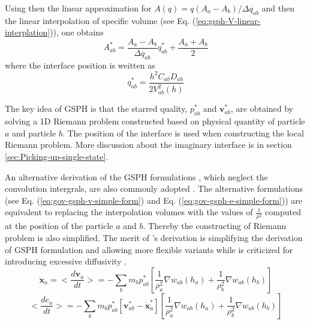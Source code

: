 Using then the linear approximation for $A(q) = q(A_a - A_b)/ \Delta q_{ab}$ and then the linear interpolation of specific volume (see Eq. (\ref{eq:gsph-V-linear-interplation})), one obtains 
\begin{equation}
A_{ab}^{\ast} = \frac{A_a - A_b}{\Delta q_{ab}} q_{ab}^{\ast} + \frac{A_a + A_b}{2}
\label{eq:GSPH-f-interpolation-evaluation}
\end{equation}
where the interface position is weitten as
\begin{equation}
q_{ab}^{\ast} = \frac{h^2 C_{ab} D_{ab}}{2V_{ab}^2(h)}
\label{eq:GSPH-f-interpolation-evaluation}
\end{equation}

The key idea of GSPH is that the starred quality, $p_{a b}^{\ast}$ and $\textbf{v}_{a b}^{\ast}$, are obtained by solving a 1D Riemann problem constructed based on physical quantity of particle $a$ and particle $b$. The position of the interface is used when constructing the local Riemann problem.
More discussion about the imaginary interface is in section \ref{sec:Picking-up-single-state}.

An alternative derivation of the GSPH formulations \citep{cha2003implementations}, which neglect the convolution intergrals, are also commonly adopted \citep[e.g.][]{puri2014approximate}. The alternative formulations (see Eq. (\ref{eq:gov-gsph-v-simple-form}) and Eq. (\ref{eq:gov-gsph-e-simple-form})) are equivalent to replacing the interpolation volumes with the values of $\frac{1}{\rho^2}$ computed at the position of the particle $a$ and $b$. Thereby the constructing of Riemann problem is also simplified. The merit of \citet{cha2003implementations}'s derivation is simplifying the derivation of GSPH formulation and allowing more flexible variants while is criticized for introducing excessive diffusivity \citep{borgani2012hydrodynamic}.  
\begin{equation}
\ddot{\textbf{x}}_{a} = <\dfrac{d \textbf{v}_{a}}{dt}>= -\sum_{b} m_{b} p_{a b}^{\ast} \left[\frac{1}{\rho_{a}^2} \nabla w_{a b}(h_{a}) + \frac{1}{\rho_{b}^2} \nabla w_{a b}(h_{b}) \right]
\label{eq:gov-gsph-v-simple-form}
\end{equation}
\begin{equation}
<\dfrac{d e_{a}}{dt}>= - \sum_{b} m_{b} p_{a b}^{\ast} [\textbf{v}_{a b}^{\ast} - \dot{\textbf{x}}_{a}^{\ast}] \left[\frac{1}{\rho_{a}^2} \nabla w_{a b}(h_{a}) + \frac{1}{\rho_{b}^2} \nabla w_{a b}(h_{b}) \right]
\label{eq:gov-gsph-e-simple-form}
\end{equation}

